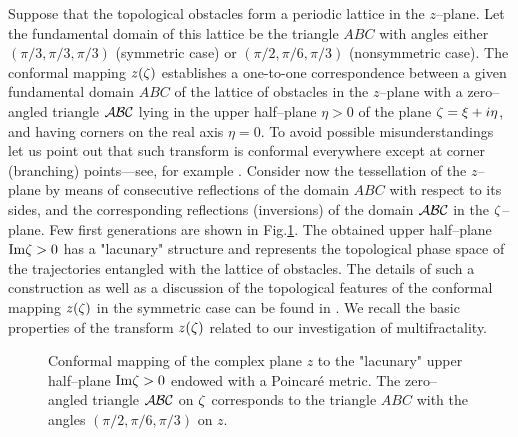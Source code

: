 Suppose that the topological obstacles form a periodic lattice in the $z$--plane.  Let
the fundamental domain of this lattice be the triangle $ABC$ with  angles
either $(\pi/3,\pi/3,\pi/3)$ (symmetric case) or  $(\pi/2,\pi/6,\pi/3)$ (nonsymmetric case). The conformal  mapping $z(\zeta)$ establishes a
one-to-one correspondence between a given  fundamental domain $ABC$ of the
lattice of obstacles in the $z$--plane with a  zero--angled triangle ${\cal ABC}$
lying in the upper half--plane $\eta>0$  of the plane $\zeta=\xi+i\eta$, and
having corners on the real axis $\eta=0$. To  avoid possible misunderstandings let
us point out that such transform is  conformal everywhere except at corner
(branching) points---see, for example  \cite{kopp}. Consider now the
tessellation of the $z$--plane by means of  consecutive reflections of the domain
$ABC$ with respect to its sides, and  the corresponding reflections (inversions) of
the domain ${\cal ABC}$ in  the $\zeta$--plane. Few first generations are shown in
Fig.\ref{fig:lacun}. The  obtained upper half--plane ${\rm Im} \zeta >0$ has
a "lacunary" structure and represents the topological phase space of the
trajectories entangled with  the lattice of obstacles. The details of such
a construction as well as a  discussion of the topological features of the
conformal mapping $z(\zeta)$ in the  symmetric case  can be found  in
\cite{nechaev}. We recall  the basic properties of the
transform $z(\zeta)$ related to our  investigation of multifractality.  
\begin{figure} 
\begin{center} 
\end{center} 
\caption{Conformal mapping of the complex plane $z$ to the "lacunary" upper
half--plane ${\rm Im}\zeta>0$ endowed with a Poincar\'e metric. The zero--angled
triangle ${\cal ABC}$ on $\zeta$ corresponds to the triangle $ABC$ with the
angles  $(\pi/2,\pi/6,\pi/3)$ on $z$.}
\label{fig:lacun}
\end{figure}

